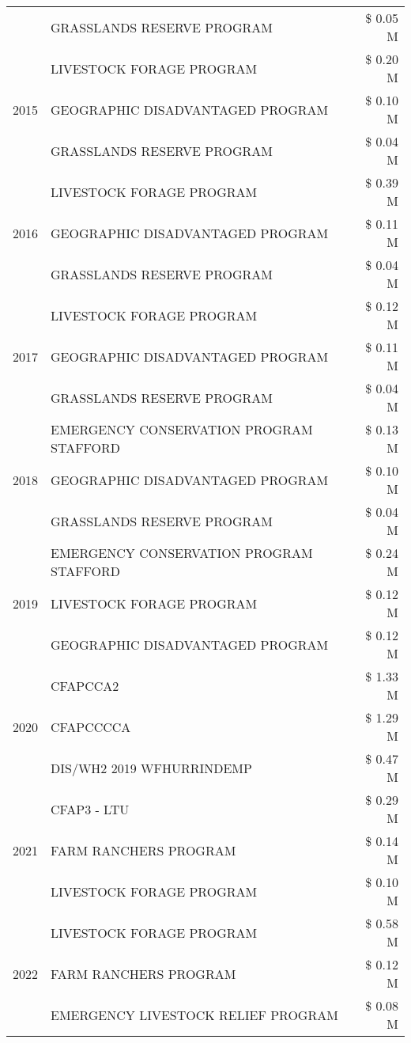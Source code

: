 \begin{tabular}{llr}
 & GRASSLANDS RESERVE PROGRAM & \$ 0.05 M \\
\cline{1-3}
\multirow[t]{3}{*}{2015} & LIVESTOCK FORAGE PROGRAM & \$ 0.20 M \\
 & GEOGRAPHIC DISADVANTAGED PROGRAM & \$ 0.10 M \\
 & GRASSLANDS RESERVE PROGRAM & \$ 0.04 M \\
\cline{1-3}
\multirow[t]{3}{*}{2016} & LIVESTOCK FORAGE PROGRAM & \$ 0.39 M \\
 & GEOGRAPHIC DISADVANTAGED PROGRAM & \$ 0.11 M \\
 & GRASSLANDS RESERVE PROGRAM & \$ 0.04 M \\
\cline{1-3}
\multirow[t]{3}{*}{2017} & LIVESTOCK FORAGE PROGRAM & \$ 0.12 M \\
 & GEOGRAPHIC DISADVANTAGED PROGRAM & \$ 0.11 M \\
 & GRASSLANDS RESERVE PROGRAM & \$ 0.04 M \\
\cline{1-3}
\multirow[t]{3}{*}{2018} & EMERGENCY CONSERVATION PROGRAM STAFFORD & \$ 0.13 M \\
 & GEOGRAPHIC DISADVANTAGED PROGRAM & \$ 0.10 M \\
 & GRASSLANDS RESERVE PROGRAM & \$ 0.04 M \\
\cline{1-3}
\multirow[t]{3}{*}{2019} & EMERGENCY CONSERVATION PROGRAM STAFFORD & \$ 0.24 M \\
 & LIVESTOCK FORAGE PROGRAM & \$ 0.12 M \\
 & GEOGRAPHIC DISADVANTAGED PROGRAM & \$ 0.12 M \\
\cline{1-3}
\multirow[t]{3}{*}{2020} & CFAPCCA2 & \$ 1.33 M \\
 & CFAPCCCCA & \$ 1.29 M \\
 & DIS/WH2 2019 WFHURRINDEMP & \$ 0.47 M \\
\cline{1-3}
\multirow[t]{3}{*}{2021} & CFAP3 - LTU & \$ 0.29 M \\
 & FARM RANCHERS PROGRAM & \$ 0.14 M \\
 & LIVESTOCK FORAGE PROGRAM & \$ 0.10 M \\
\cline{1-3}
\multirow[t]{3}{*}{2022} & LIVESTOCK FORAGE PROGRAM & \$ 0.58 M \\
 & FARM RANCHERS PROGRAM & \$ 0.12 M \\
 & EMERGENCY LIVESTOCK RELIEF PROGRAM & \$ 0.08 M \\
\cline{1-3}
\bottomrule
\end{tabular}

